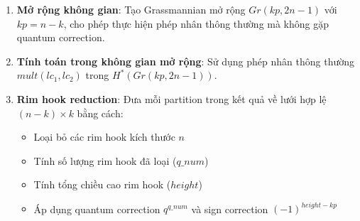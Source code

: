 \begin{enumerate}
\item \textbf{Mở rộng không gian}: Tạo Grassmannian mở rộng $Gr(kp, 2n-1)$ với $kp = n-k$, cho phép thực hiện phép nhân thông thường mà không gặp quantum correction.

\item \textbf{Tính toán trong không gian mở rộng}: Sử dụng phép nhân thông thường $mult(lc_1, lc_2)$ trong $H^*(Gr(kp, 2n-1))$.

\item \textbf{Rim hook reduction}: Đưa mỗi partition trong kết quả về lưới hợp lệ $(n-k) \times k$ bằng cách:
   \begin{itemize}
   \item Loại bỏ các rim hook kích thước $n$ 
   \item Tính số lượng rim hook đã loại ($q\_num$)
   \item Tính tổng chiều cao rim hook ($height$)
   \item Áp dụng quantum correction $q^{q\_num}$ và sign correction $(-1)^{height-kp}$
   \end{itemize}
\end{enumerate}
